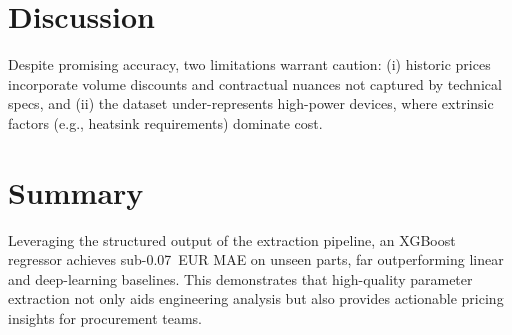 \section{Discussion}
Despite promising accuracy, two limitations warrant caution: (i) historic prices incorporate volume discounts and contractual nuances not captured by technical specs, and (ii) the dataset under-represents high-power devices, where extrinsic factors (e.g., heatsink requirements) dominate cost.

\section{Summary}
Leveraging the structured output of the extraction pipeline, an XGBoost regressor achieves sub-0.07~EUR MAE on unseen parts, far outperforming linear and deep-learning baselines.  This demonstrates that high-quality parameter extraction not only aids engineering analysis but also provides actionable pricing insights for procurement teams.